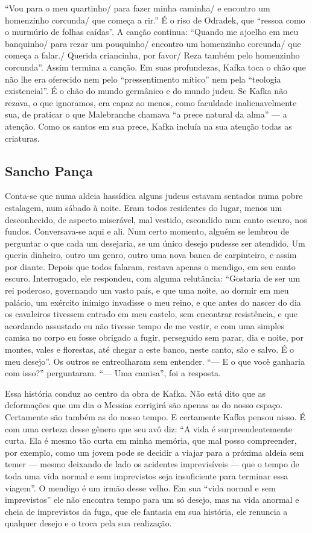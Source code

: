 ``Vou para o meu quartinho/ para fazer minha caminha/ e encontro um
homenzinho corcunda/ que começa a rir.'' É o riso de Odradek, que
``ressoa como o murmúrio de folhas caídas''. A canção continua: ``Quando
me ajoelho em meu banquinho/ para rezar um pouquinho/ encontro um
homenzinho corcunda/ que começa a falar./ Querida criancinha, por favor/
Reza também pelo homenzinho corcunda''. Assim termina a canção. Em suas
profundezas, Kafka toca o chão que não lhe era oferecido nem pelo
``pressentimento mítico'' nem pela ``teologia existencial''. É o chão do
mundo germânico e do mundo judeu. Se Kafka não rezava, o que ignoramos,
era capaz ao menos, como faculdade inalienavelmente sua, de praticar o
que Malebranche chamava ``a prece natural da alma'' --- a atenção. Como
os santos em sua prece, Kafka incluía na sua atenção todas as criaturas.

\subsection{Sancho Pança}

Conta-se que numa aldeia hassídica alguns judeus estavam sentados numa
pobre estalagem, num sábado à noite. Eram todos residentes do lugar,
menos um desconhecido, de aspecto miserável, mal vestido, escondido num
canto escuro, nos fundos. Conversava-se aqui e ali. Num certo momento,
alguém se lembrou de perguntar o que cada um desejaria, se um único
desejo pudesse ser atendido. Um queria dinheiro, outro um genro, outro
uma nova banca de carpinteiro, e assim por diante. Depois que todos
falaram, restava apenas o mendigo, em seu canto escuro. Interrogado, ele
respondeu, com alguma relutância: ``Gostaria de ser um rei poderoso,
governando um vasto país, e que uma noite, ao dormir em meu palácio, um
exército inimigo invadisse o meu reino, e que antes do nascer do dia os
cavaleiros tivessem entrado em meu castelo, sem encontrar resistência, e
que acordando assustado eu não tivesse tempo de me vestir, e com uma
simples camisa no corpo eu fosse obrigado a fugir, perseguido sem parar,
dia e noite, por montes, vales e florestas, até chegar a este banco,
neste canto, são e salvo. É o meu desejo''. Os outros se entreolharam
sem entender. ``--- E o que você ganharia com isso?'' perguntaram. ``---
Uma camisa'', foi a resposta.

Essa história conduz ao centro da obra de Kafka. Não está dito que as
deformações que um dia o Messias corrigirá são apenas as do nosso
espaço. Certamente são também as do nosso tempo. E certamente Kafka
pensou nisso. É com uma certeza desse gênero que seu avô diz: ``A vida é
surpreendentemente curta. Ela é mesmo tão curta em minha memória, que
mal posso compreender, por exemplo, como um jovem pode se decidir a
viajar para a próxima aldeia sem temer --- mesmo deixando de lado os
acidentes imprevisíveis --- que o tempo de toda uma vida normal e sem
imprevistos seja insuficiente para terminar essa viagem''. O mendigo é
um irmão desse velho. Em sua ``vida normal e sem imprevistos'' ele não
encontra tempo para um só desejo, mas na vida anormal e cheia de
imprevistos da fuga, que ele fantasia em sua história, ele renuncia a
qualquer desejo e o troca pela sua realização.

